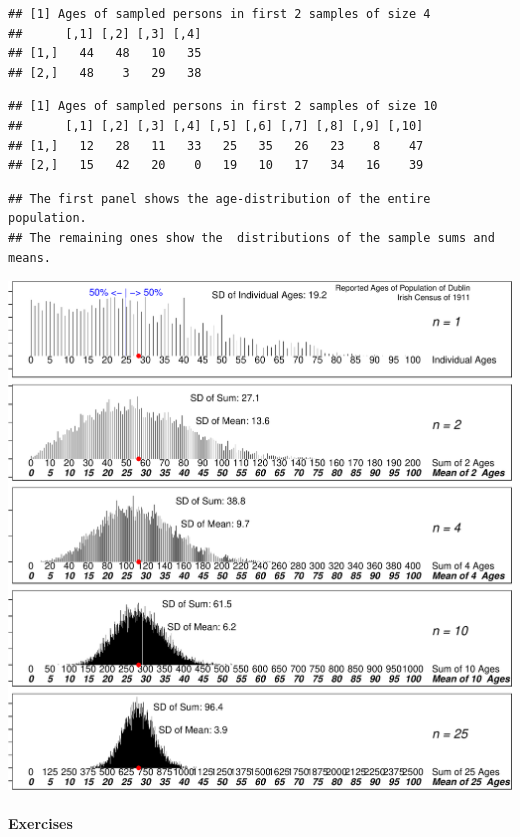 \documentclass[
]{article}
\begin{document}
\begin{verbatim}
## [1] Ages of sampled persons in first 2 samples of size 4
##      [,1] [,2] [,3] [,4]
## [1,]   44   48   10   35
## [2,]   48    3   29   38
\end{verbatim}

\begin{verbatim}
## [1] Ages of sampled persons in first 2 samples of size 10
##      [,1] [,2] [,3] [,4] [,5] [,6] [,7] [,8] [,9] [,10]
## [1,]   12   28   11   33   25   35   26   23    8    47
## [2,]   15   42   20    0   19   10   17   34   16    39
\end{verbatim}

\begin{verbatim}
## The first panel shows the age-distribution of the entire population.
## The remaining ones show the  distributions of the sample sums and means.
\end{verbatim}

\begin{center}\includegraphics{hanley-computing_files/figure-latex/unnamed-chunk-5-1} \end{center}

\hypertarget{exercises}{%
\paragraph{Exercises}\label{exercises}}
\end{document}
